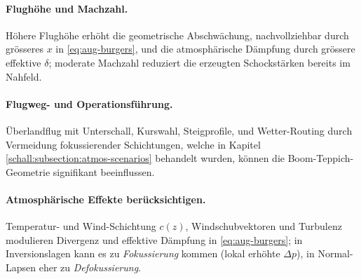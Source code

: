 \paragraph{Flughöhe und Machzahl.}
Höhere Flughöhe erhöht die geometrische Abschwächung, nachvollziehbar durch
grösseres $x$ in \eqref{eq:aug-burgers}, und die atmosphärische Dämpfung durch
grössere effektive $\delta$; moderate Machzahl reduziert die erzeugten
Schockstärken bereits im Nahfeld.

\paragraph{Flugweg- und Operationsführung.}
Überlandflug mit Unterschall, Kurswahl, Steigprofile, und Wetter-Routing
durch Vermeidung fokussierender Schichtungen, welche in Kapitel
\ref{schall:subsection:atmos-scenarios} behandelt wurden, können die
Boom-Teppich-Geometrie signifikant beeinflussen.

\paragraph{Atmosphärische Effekte berücksichtigen.}
Temperatur- und Wind-Schichtung $c(z)$, Windschubvektoren und Turbulenz
modulieren Divergenz und effektive Dämpfung in \eqref{eq:aug-burgers};
in Inversionslagen kann es zu \emph{Fokussierung} kommen (lokal erhöhte
$\Delta p$), in Normal-Lapsen eher zu \emph{Defokussierung}.